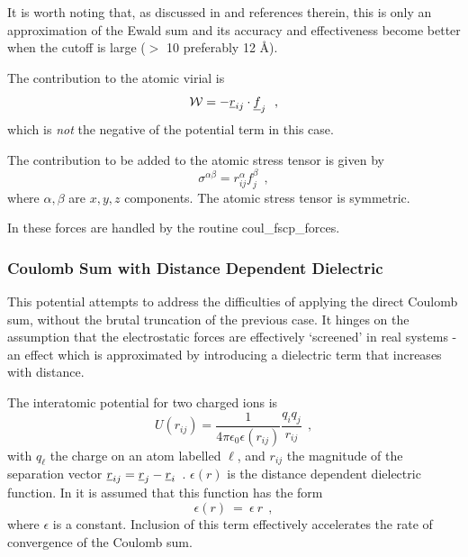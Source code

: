 It is worth noting that, as discussed in \cite{fennell-06a} and
references therein, this is only an approximation of the Ewald
sum and its accuracy and effectiveness become better when the
cutoff is large ($>$ 10 preferably 12 \AA).

The contribution to the atomic virial is
\begin{equation}
{\cal W} = -\mbox{$\underline{r}$}_{ij} \cdot \mbox{$\underline{f}$}_{j}~~,
\end{equation}
which is {\em not} the negative of the potential term in this case.

The contribution to be added to the atomic stress
tensor is given by
\begin{equation}
\sigma^{\alpha \beta} = r_{ij}^{\alpha} f_{j}^{\beta}~~,
\end{equation}
where $\alpha,\beta$ are $x,y,z$ components.  The atomic stress
tensor is symmetric.

In \D these forces are handled by the routine {\sc coul\_fscp\_forces}.

\subsubsection{Coulomb Sum with Distance Dependent Dielectric}

This potential attempts to address the difficulties of applying
the direct Coulomb sum, without the
brutal truncation of the previous case.  It hinges on the
assumption that the electrostatic forces are effectively
`screened' in real systems - an effect which is approximated by
introducing a dielectric term that increases with distance.

The interatomic potential for two charged ions is
\begin{equation}
U(r_{ij}) = \frac{1}{4\pi\epsilon_{0}\epsilon(r_{ij})} \frac{q_{i}q_{j}}{r_{ij}}~~,
\end{equation}
with $q_{\ell}$ the charge on an atom labelled $\ell$, and
$r_{ij}$ the magnitude of the separation vector
$\mbox{$\underline{r}$}_{ij}=\mbox{$\underline{r}$}_{j}-\mbox{$\underline{r}$}_{i}$~.  $\epsilon(r)$ is the
distance dependent dielectric
function.  In \D it is assumed that this function has the form
\begin{equation}
\epsilon(r)~=~\epsilon~r~~,
\end{equation}
where $\epsilon$ is a constant.  Inclusion of this term
effectively accelerates the rate of convergence of the Coulomb
sum.

